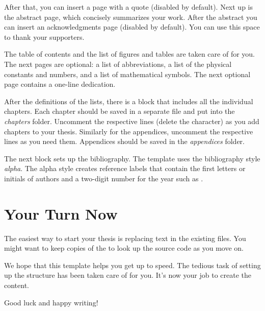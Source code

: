 After that, you can insert a page with a quote (disabled by default).
Next up is the abstract page, which concisely summarizes your work.
After the abstract you can insert an acknowledgments page (disabled by default).
You can use this space to thank your supporters.

The table of contents and the list of figures and tables are taken care of for you.%
The next pages are optional: a list of abbreviations, a list of the physical constants and numbers, and a list of mathematical symbols.
The next optional page contains a one-line dedication.

After the definitions of the lists, there is a block that includes all the individual chapters. Each chapter should be saved in a separate file and put into the \emph{chapters} folder.
Uncomment the respective lines (delete the \code{\%} character) as you add chapters to your thesis. Similarly for the appendices, uncomment the respective lines as you need them. Appendices should be saved in the \emph{appendices} folder.

The next block sets up the bibliography. The template uses the bibliography style \emph{alpha}. The alpha style creates reference labels that contain the first letters or initials of authors and a two-digit number for the year such as \cite{Hintz02}.


\section{Your Turn Now}

The easiest way to start your thesis is replacing text in the existing files. You might want to keep copies of the  to look up the source code as you move on.

We hope that this template helps you get up to speed. The tedious task of setting up the structure has been taken care of for you. It's now your job to create the content.

Good luck and happy writing!

